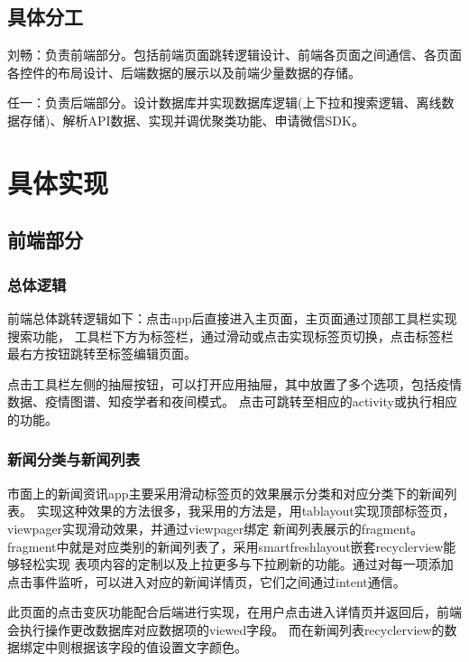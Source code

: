 \documentclass[UTF8]{article}
\begin{document}
\subsection*{具体分工}
刘畅：负责前端部分。包括前端页面跳转逻辑设计、前端各页面之间通信、各页面各控件的布局设计、后端数据的展示以及前端少量数据的存储。

任一：负责后端部分。设计数据库并实现数据库逻辑(上下拉和搜索逻辑、离线数据存储)、解析API数据、实现并调优聚类功能、申请微信SDK。


\clearpage
\section{具体实现}
\subsection{前端部分}
\subsubsection{总体逻辑}
前端总体跳转逻辑如下：点击app后直接进入主页面，主页面通过顶部工具栏实现搜索功能，
工具栏下方为标签栏，通过滑动或点击实现标签页切换，点击标签栏最右方按钮跳转至标签编辑页面。

点击工具栏左侧的抽屉按钮，可以打开应用抽屉，其中放置了多个选项，包括疫情数据、疫情图谱、知疫学者和夜间模式。
点击可跳转至相应的activity或执行相应的功能。
\subsubsection{新闻分类与新闻列表}
市面上的新闻资讯app主要采用滑动标签页的效果展示分类和对应分类下的新闻列表。
实现这种效果的方法很多，我采用的方法是，用tablayout实现顶部标签页，viewpager实现滑动效果，并通过viewpager绑定
新闻列表展示的fragment。fragment中就是对应类别的新闻列表了，采用smartfreshlayout嵌套recyclerview能够轻松实现
表项内容的定制以及上拉更多与下拉刷新的功能。通过对每一项添加点击事件监听，可以进入对应的新闻详情页，它们之间通过intent通信。

此页面的点击变灰功能配合后端进行实现，在用户点击进入详情页并返回后，前端会执行操作更改数据库对应数据项的viewed字段。
而在新闻列表recyclerview的数据绑定中则根据该字段的值设置文字颜色。
\end{document}
